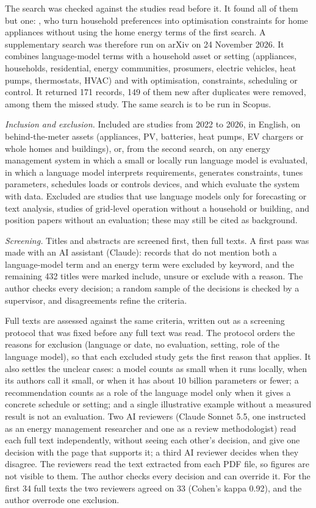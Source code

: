 The search was checked against the studies read before it. It found
all of them but one: \textcite{sanguinetti2025}, who turn household
preferences into optimisation constraints for home appliances without
using the home energy terms of the first search. A supplementary search
was therefore run on arXiv on 24 November 2026. It combines
language-model terms with a household asset or setting (appliances,
households, residential, energy communities, prosumers, electric
vehicles, heat pumps, thermostats, HVAC) and with optimisation,
constraints, scheduling or control. It returned 171 records, 149 of them
new after duplicates were removed, among them the missed study. The same
search is to be run in Scopus.

\textit{Inclusion and exclusion.} Included are studies from 2022 to
2026, in English, on behind-the-meter assets (appliances, PV, batteries,
heat pumps, EV chargers or whole homes and buildings), or, from the
second search, on any energy management system in which a small or
locally run language model is evaluated, in which a
language model interprets requirements, generates constraints, tunes
parameters, schedules loads or controls devices, and which evaluate the
system with data. Excluded are studies that use language models only for
forecasting or text analysis, studies of grid-level operation without a
household or building, and position papers without an evaluation; these
may still be cited as background.

\textit{Screening.} Titles and abstracts are screened
first, then full texts. A first pass was made with an AI assistant
(Claude): records that do not mention both a language-model term and an
energy term were excluded by keyword, and the remaining 432 titles were
marked include, unsure or exclude with a reason. The author checks every
decision; a random sample of the decisions is checked by a supervisor,
and disagreements refine the criteria.

Full texts are assessed against the same criteria, written out as a
screening protocol that was fixed before any full text was read. The
protocol orders the reasons for exclusion (language or date, no
evaluation, setting, role of the language model), so that each excluded
study gets the first reason that applies. It also settles the unclear
cases: a model counts as small when it runs locally, when its authors
call it small, or when it has about 10 billion parameters or fewer; a
recommendation counts as a role of the language model only when it
gives a concrete schedule or setting; and a single illustrative example
without a measured result is not an evaluation. Two AI reviewers (Claude
Sonnet 5.5, one instructed as an energy management researcher and one as
a review methodologist) read each full text independently, without
seeing each other's decision, and give one decision with the page that
supports it; a third AI reviewer decides when they disagree. The
reviewers read the text extracted from each PDF file, so figures are not
visible to them. The author checks every decision and can override it.
For the first 34 full texts the two reviewers agreed on 33 (Cohen's
kappa 0.92), and the author overrode one exclusion.

